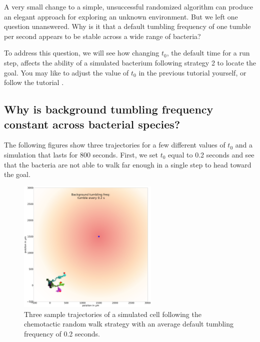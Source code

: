 A very small change to a simple, unsuccessful randomized algorithm can produce an elegant approach for exploring an unknown environment. But we left one question unanswered. Why is it that a default tumbling frequency of one tumble per second appears to be stable across a wide range of bacteria?

To address this question, we will see how changing $t_0$, the default time for a run step, affects the ability of a simulated bacterium following strategy 2 to locate the goal. You may like to adjust the value of $t_0$ in the previous tutorial  yourself, or follow the tutorial .


\FloatBarrier
{}
{}
\subsection{Why is background tumbling frequency constant across bacterial species?}


The following figures show three trajectories for a few different values of $t_0$ and a simulation that lasts for 800 seconds. First, we set $t_0$ equal to 0.2 seconds and see that the bacteria are not able to walk far enough in a single step to head toward the goal.

\begin{figure}[h]
\centering
\mySfFamily
\includegraphics[width = 0.6\textwidth]{../images/chemotaxis_traj_0.2_uniform.png}
\caption{Three sample trajectories of a simulated cell following the chemotactic random walk strategy with an average default tumbling frequency of 0.2 seconds.}
\label{fig:chemotaxis_traj_0.2_uniform}
\end{figure}


